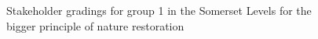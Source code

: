 \documentclass[
  12pt,
  letterpaper,
  DIV=11,
  numbers=noendperiod]{scrartcl}
\begin{document}
\begin{figure}[H]


\caption{\label{fig-SomBigG1}Stakeholder gradings for group 1 in the
Somerset Levels for the bigger principle of nature restoration}

\end{figure}%
\end{document}
